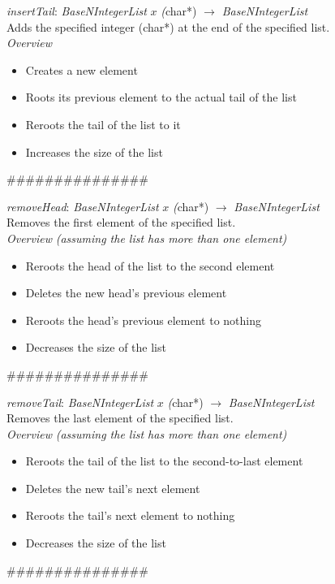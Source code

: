 \documentclass[book, backcover, english, report, nodocumentinfo]{upmethodology-document}
\newcommand{\nxtalgo}{\centerline{$$$$\#\#\#\#\#\#\#\#\#\#\#\#\#\#\#$$$$}}
\newcommand{\ov}{\emph{Overview}}
\begin{document}
		\begin{minipage}{\linewidth}
			\emph{insertTail}: \emph{BaseNIntegerList} \(x\) \emph(char*) \(\rightarrow\) \emph{BaseNIntegerList}\\
				Adds the specified integer (char*) at the end of the specified list.\\
			\ov
			\begin{itemize}
				\item Creates a new element
				\item Roots its previous element to the actual tail of the list
				\item Reroots the tail of the list to it
				\item Increases the size of the list
			\end{itemize}
			\label{algo:BNIL-InsertTail}
			
		\end{minipage}
		\nxtalgo

		\begin{minipage}{\linewidth}
			\emph{removeHead}: \emph{BaseNIntegerList} \(x\) \emph(char*) \(\rightarrow\) \emph{BaseNIntegerList}\\
				Removes the first element of the specified list.\\
			\ov \emph{ (assuming the list has more than one element)}
			\begin{itemize}
				\item Reroots the head of the list to the second element
				\item Deletes the new head's previous element
				\item Reroots the head's previous element to nothing
				\item Decreases the size of the list
			\end{itemize}
			\label{algo:BNIL-RemoveHead}
			
		\end{minipage}
		\nxtalgo

		\begin{minipage}{\linewidth}
			\emph{removeTail}: \emph{BaseNIntegerList} \(x\) \emph(char*) \(\rightarrow\) \emph{BaseNIntegerList}\\
				Removes the last element of the specified list.\\
			\ov \emph{ (assuming the list has more than one element)}
			\begin{itemize}
				\item Reroots the tail of the list to the second-to-last element
				\item Deletes the new tail's next element
				\item Reroots the tail's next element to nothing
				\item Decreases the size of the list
			\end{itemize}
			\label{algo:BNIL-RemoveTail}
			
		\end{minipage}
		\nxtalgo
\end{document}
